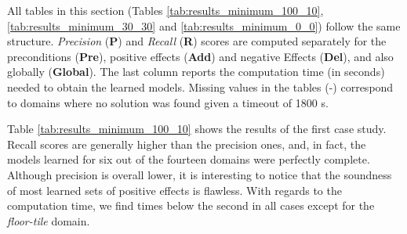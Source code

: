 All tables in this section (Tables \ref{tab:results_minimum_100_10}, \ref{tab:results_minimum_30_30} and \ref{tab:results_minimum_0_0}) follow the same structure. {\em Precision} ({\bf P}) and {\em Recall} ({\bf R}) scores are computed separately for the preconditions ({\bf Pre}), positive effects ({\bf Add}) and negative Effects ({\bf Del}), and also globally ({\bf Global}). The last column reports the computation time (in seconds) needed to obtain the learned models. Missing values in the tables (-) correspond to domains where no solution was found given a timeout of 1800 s.

Table \ref{tab:results_minimum_100_10} shows the results of the first case study. Recall scores are generally higher than the precision ones, and, in fact, the models learned for six out of the fourteen domains were perfectly complete. Although precision is overall lower, it is interesting to notice that the soundness of most learned sets of positive effects is flawless. With regards to the computation time, we find times below the second in all cases except for the {\em floor-tile} domain.


